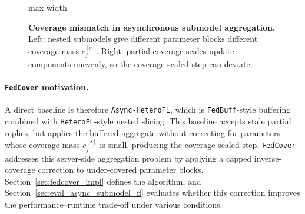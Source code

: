 \begin{figure}[H]
\begin{adjustbox}{max width=\textwidth}
\end{adjustbox}
\caption{\textbf{Coverage mismatch in asynchronous submodel aggregation.} Left: nested submodels give different parameter blocks different coverage mass \(c_j^{[s]}\). Right: partial coverage scales update components unevenly, so the coverage-scaled step can deviate.}
\label{fig:async_submodel_coverage_mismatch}
\end{figure}

\paragraph{\texttt{FedCover} motivation.}
\label{sec:coverage_mismatch_related}
\label{sec:fedcover_related}
A direct baseline is therefore \texttt{Async-HeteroFL}, which is \texttt{FedBuff}-style buffering combined with \texttt{HeteroFL}-style nested slicing. This baseline accepts stale partial replies, but applies the buffered aggregate without correcting for parameters whose coverage mass \(c_j^{[s]}\) is small, producing the coverage-scaled step. \texttt{FedCover} addresses this server-side aggregation problem by applying a capped inverse-coverage correction to under-covered parameter blocks. Section~\ref{sec:fedcover_impl} defines the algorithm, and Section~\ref{sec:eval_async_submodel_fl} evaluates whether this correction improves the performance--runtime trade-off under various conditions.


